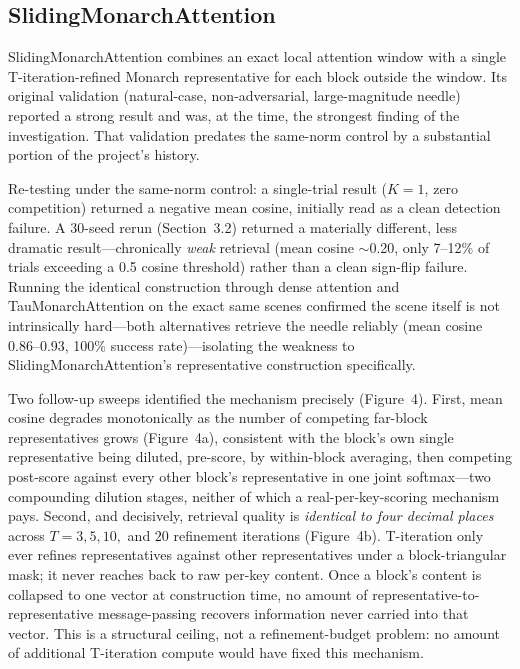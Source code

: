 \documentclass[11pt]{article}
\begin{document}
\subsection{SlidingMonarchAttention}

SlidingMonarchAttention combines an exact local attention window with a single
T-iteration-refined Monarch representative for each block outside the window. Its original
validation (natural-case, non-adversarial, large-magnitude needle) reported a strong
result and was, at the time, the strongest finding of the investigation. That validation
predates the same-norm control by a substantial portion of the project's history.

Re-testing under the same-norm control: a single-trial result ($K{=}1$, zero competition)
returned a negative mean cosine, initially read as a clean detection failure. A 30-seed
rerun (Section~3.2) returned a materially different, less dramatic result---chronically
\emph{weak} retrieval (mean cosine $\sim$0.20, only 7--12\% of trials exceeding a
0.5 cosine threshold) rather than a clean sign-flip failure. Running the identical
construction through dense attention and TauMonarchAttention on the exact same scenes
confirmed the scene itself is not intrinsically hard---both alternatives retrieve the
needle reliably (mean cosine 0.86--0.93, 100\% success rate)---isolating the weakness to
SlidingMonarchAttention's representative construction specifically.

Two follow-up sweeps identified the mechanism precisely (Figure~4). First, mean
cosine degrades monotonically as the number of competing far-block representatives grows
(Figure~4a), consistent with the block's own single representative being diluted, pre-score,
by within-block averaging, then competing post-score against every other block's
representative in one joint softmax---two compounding dilution stages, neither of which a
real-per-key-scoring mechanism pays. Second, and decisively, retrieval quality is
\emph{identical to four decimal places} across $T = 3, 5, 10,$ and $20$ refinement
iterations (Figure~4b). T-iteration only ever refines representatives against other
representatives under a block-triangular mask; it never reaches back to raw per-key
content. Once a block's content is collapsed to one vector at construction time, no amount
of representative-to-representative message-passing recovers information never carried
into that vector. This is a structural ceiling, not a refinement-budget problem: no amount
of additional T-iteration compute would have fixed this mechanism.
\end{document}
